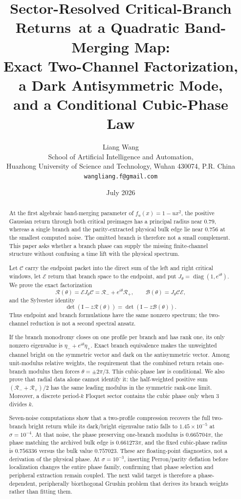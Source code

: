\documentclass[11pt]{article}
\title{\textbf{Sector-Resolved Critical-Branch Returns}\
\textbf{at a Quadratic Band-Merging Map:}\\[0.35em]
\large Exact Two-Channel Factorization, a Dark Antisymmetric Mode,\\
and a Conditional Cubic-Phase Law}
\author{Liang Wang\\
\small School of Artificial Intelligence and Automation,\\[-0.2em]
\small Huazhong University of Science and Technology, Wuhan 430074, P.R. China\\
\small \texttt{wangliang.f@gmail.com}}
\date{July 2026}
\theoremstyle{definition}
\theoremstyle{remark}
\newcommand{\Id}{\mathrm I}
\newcommand{\cR}{\mathcal R}
\newcommand{\cB}{\mathcal B}
\newcommand{\cC}{\mathcal C}
\newcommand{\cE}{\mathcal E}
\begin{document}
\maketitle

\begin{abstract}
At the first algebraic band-merging parameter of
$f_u(x)=1-u x^2$, the positive Gaussian return through both critical
preimages has a principal radius near $0.79$, whereas a single branch and
the parity-extracted physical bulk edge lie near $0.756$ at the smallest
computed noise.  The omitted branch is therefore not a small complement.
This paper asks whether a branch phase can supply the missing finite-channel
structure without confusing a time lift with the physical spectrum.

Let $\cC$ carry the endpoint packet into the direct sum of the left and
right critical windows, let $\cE$ return that branch space to the endpoint,
and put $J_\theta=\operatorname{diag}(1,e^{i\theta})$.  We prove the exact
factorization
\[
 \cR(\theta)=\cE J_\theta\cC
 =\cR_-+e^{i\theta}\cR_+,
 \qquad
 \cB(\theta)=J_\theta\cC\cE,
\]
and the Sylvester identity
\[
 \det(\Id-z\cR(\theta))
 =\det(\Id-z\cB(\theta)).
\]
Thus endpoint and branch formulations have the same nonzero spectrum; the
two-channel reduction is not a second spectral ansatz.

If the branch monodromy closes on one profile per branch and has rank one,
its only nonzero eigenvalue is
$\eta_-+e^{i\theta}\eta_+$.  Exact branch equivalence makes the unweighted
channel bright on the symmetric vector and dark on the antisymmetric vector.
Among unit-modulus relative weights, the requirement that the combined
return retain one-branch modulus then forces
$\theta=\pm2\pi/3$.  This cubic-phase law is conditional.  We also prove
that radial data alone cannot identify it: the half-weighted positive sum
$(\cR_-+\cR_+)/2$ has the same leading modulus in the symmetric rank-one
limit.  Moreover, a discrete period-$k$ Floquet sector contains the cubic
phase only when $3$ divides $k$.

Seven-noise computations show that a two-profile compression recovers the
full two-branch bright return while its dark/bright eigenvalue ratio falls to
$1.45\times10^{-5}$ at $\sigma=10^{-4}$.  At that noise, the phase preserving
one-branch modulus is $0.665704\pi$, the phase matching the archived bulk
edge is $0.661273\pi$, and the fixed cubic-phase radius is $0.756336$ versus
the bulk value $0.757023$.  These are floating-point diagnostics, not a
derivation of the physical phase.  At $\sigma=10^{-3}$, inserting
Perron/parity deflation before localization changes the entire phase family,
confirming that phase selection and peripheral extraction remain coupled.
The next valid target is therefore a phase-dependent, peripherally
biorthogonal Grushin problem that derives its branch weights rather than
fitting them.
\end{abstract}
\end{document}
